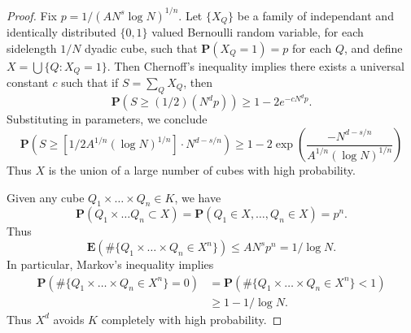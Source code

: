 \begin{proof}
	Fix $p = 1/(AN^s \log N)^{1/n}$. Let $\{ X_Q \}$ be a family of independant and identically distributed $\{ 0, 1 \}$ valued Bernoulli random variable, for each sidelength $1/N$ dyadic cube, such that $\mathbf{P}(X_Q = 1) = p$ for each $Q$, and define $X = \bigcup \{ Q : X_Q = 1 \}$. Then Chernoff's inequality implies there exists a universal constant $c$ such that if $S = \sum_Q X_Q$, then
	\[ \mathbf{P} \left( S \geq (1/2)(N^d p) \right) \geq 1 - 2 e^{- c N^d p}. \]
	Substituting in parameters, we conclude
	\begin{equation} \label{fourierdim1} \mathbf{P} \left( S \geq \left[ 1/2 A^{1/n} (\log N)^{1/n} \right] \cdot N^{d - s/n} \right) \geq 1 - 2 \exp \left( \frac{-N^{d-s/n}}{A^{1/n} (\log N)^{1/n}} \right) \end{equation}
	Thus $X$ is the union of a large number of cubes with high probability.

	Given any cube $Q_1 \times \dots \times Q_n \in K$, we have
	\[ \mathbf{P}(Q_1 \times \dots Q_n \subset X) = \mathbf{P}(Q_1 \in X, \dots, Q_n \in X) = p^n. \]
	Thus
	\[ \mathbf{E}(\# \{ Q_1 \times \dots \times Q_n \in X^n \}) \leq A N^s p^n = 1/\log N. \]
	In particular, Markov's inequality implies
	\begin{equation} \label{fourierdim2}
	\begin{split}
		\mathbf{P}(\# \{ Q_1 \times \dots \times Q_n \in X^n \} = 0) &= \mathbf{P}(\# \{ Q_1 \times \dots \times Q_n \in X^n \} < 1)\\
		&\geq 1 - 1/\log N.
	\end{split}
	\end{equation}
	Thus $X^d$ avoids $K$ completely with high probability.


\end{proof}
